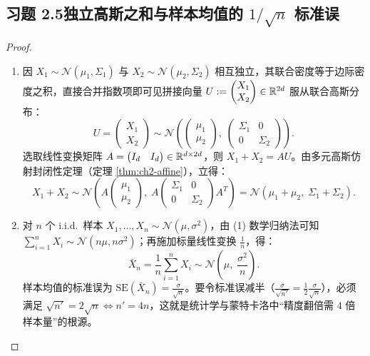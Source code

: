 \subsection*{习题 2.5\quad 独立高斯之和与样本均值的 $1/\sqrt{n}$ 标准误}
\begin{proof}
\begin{enumerate}[label=(\arabic*), leftmargin=1.8em]
  \item 因 $X_1 \sim \mathcal{N}(\mu_1, \Sigma_1)$ 与 $X_2 \sim \mathcal{N}(\mu_2, \Sigma_2)$ 相互独立，其联合密度等于边际密度之积，直接合并指数项即可见拼接向量 $U := \begin{pmatrix} X_1 \\ X_2 \end{pmatrix} \in \mathbb{R}^{2d}$ 服从联合高斯分布：
  \[
    U = \begin{pmatrix} X_1 \\ X_2 \end{pmatrix}
    \sim \mathcal{N}\!\left(\begin{pmatrix} \mu_1 \\ \mu_2 \end{pmatrix},\;
         \begin{pmatrix} \Sigma_1 & 0 \\ 0 & \Sigma_2 \end{pmatrix}\right).
  \]
  选取线性变换矩阵 $A = \begin{pmatrix} I_d & I_d \end{pmatrix} \in \mathbb{R}^{d \times 2d}$，则 $X_1 + X_2 = A U$。由多元高斯仿射封闭性定理（定理 \ref{thm:ch2-affine}），立得：
  \[
    X_1 + X_2 \sim \mathcal{N}\!\left(A\begin{pmatrix} \mu_1 \\ \mu_2 \end{pmatrix},\;
      A\begin{pmatrix} \Sigma_1 & 0 \\ 0 & \Sigma_2 \end{pmatrix}A^T\right)
    = \mathcal{N}(\mu_1 + \mu_2,\; \Sigma_1 + \Sigma_2).
  \]
  \item 对 $n$ 个 i.i.d.\ 样本 $X_1, \dots, X_n \sim \mathcal{N}(\mu, \sigma^2)$，由 (1) 数学归纳法可知 $\sum_{i=1}^n X_i \sim \mathcal{N}(n\mu, n\sigma^2)$；再施加标量线性变换 $\frac{1}{n}$，得：
  \[
    \bar{X}_n = \frac{1}{n}\sum_{i=1}^n X_i \sim \mathcal{N}\!\left(\mu,\; \frac{\sigma^2}{n}\right).
  \]
  样本均值的标准误为 $\mathrm{SE}(\bar{X}_n) = \frac{\sigma}{\sqrt{n}}$。要令标准误减半（$\frac{\sigma}{\sqrt{n'}} = \frac{1}{2}\frac{\sigma}{\sqrt{n}}$），必须满足 $\sqrt{n'} = 2\sqrt{n} \iff n' = 4n$，这就是统计学与蒙特卡洛中“精度翻倍需 $4$ 倍样本量”的根源。
\end{enumerate}
\end{proof}

